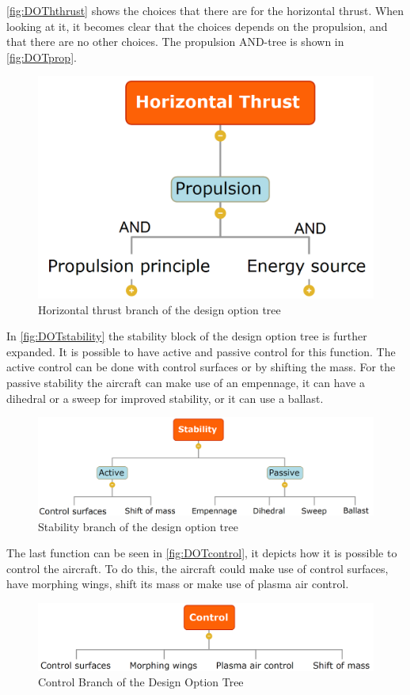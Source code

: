 \autoref{fig:DOThthrust} shows the choices that there are for the horizontal thrust. When looking at it, it becomes clear that the choices depends on the propulsion, and that there are no other choices. The propulsion AND-tree is shown in \autoref{fig:DOTprop}.

\begin{figure}[H]
\centering
\includegraphics[width=.35\textwidth]{Concepts/Figures/Horizontal_Thrust}
\caption{Horizontal thrust branch of the design option tree}
\label{fig:DOThthrust}
\end{figure}

In \autoref{fig:DOTstability} the stability block of the design option tree is further expanded. It is possible to have active and passive control for this function. The active control can be done with control surfaces or by shifting the mass. For the passive stability the aircraft can make use of an empennage, it can have a dihedral or a sweep for improved stability, or it can use a ballast.

\begin{figure}[H]
\centering
\includegraphics[width=.25\textwidth]{Concepts/Figures/Stability}
\caption{Stability branch of the design option tree}
\label{fig:DOTstability}
\end{figure}

The last function can be seen in \autoref{fig:DOTcontrol}, it depicts how it is possible to control the aircraft. To do this, the aircraft could make use of control surfaces, have morphing wings, shift its mass or make use of plasma air control.

\begin{figure}
    \centering
    \includegraphics[width=.25\textwidth]{Concepts/Figures/Control}
    \caption{Control Branch of the Design Option Tree}
    \label{fig:DOTcontrol}
\end{figure}

